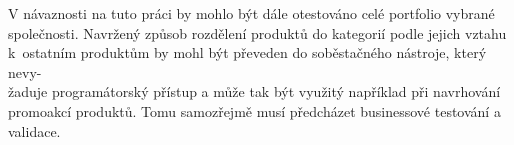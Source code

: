 V návaznosti na tuto práci by mohlo být dále otestováno celé portfolio vybrané společnosti.
Navržený způsob rozdělení produktů do kategorií podle jejich vztahu k~ostatním produktům by mohl být převeden do soběstačného nástroje, který nevy-\\žaduje programátorský přístup a může tak být využitý například při navrhování promoakcí produktů. Tomu samozřejmě musí předcházet businessové testování a validace.


